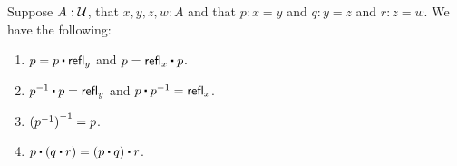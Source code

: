 \documentclass[hott-all.tex]{subfiles}
\begin{document}
\begin{lem}\label{thm:omg}%
  Suppose $A:\mathcal{U}$, that $x,y,z,w:A$ and that $p:x= y$ and $q:y = z$ and $r:z=w$.
  We have the following:
  \begin{enumerate}
  \item $p= p\ct \refl{y}$ and $p = \refl{x} \ct p$.\label{item:omg1}
  \item $\opp{p}\ct p=  \refl{y}$ and $p\ct \opp{p}= \refl{x}$.\label{item:omg2}
  \item $\mathord{{(\mathord{{p}^{-1}})}^{-1}}= p$.\label{item:omg3}
  \item $p\ct (q\ct r)=  (p\ct q)\ct r$.\label{item:omg4}
  \end{enumerate}
\end{lem}
\end{document}

